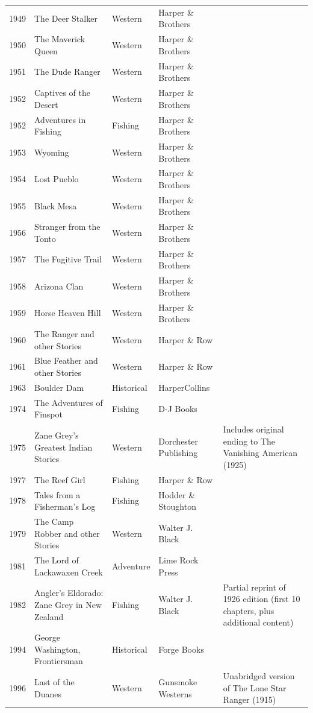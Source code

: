 \documentclass{article}
\begin{document}
\begin{tabular}{lllll}
1949 & The Deer Stalker & Western & Harper \& Brothers &  \\
1950 & The Maverick Queen & Western & Harper \& Brothers &  \\
1951 & The Dude Ranger & Western & Harper \& Brothers &  \\
1952 & Captives of the Desert & Western & Harper \& Brothers &  \\
1952 & Adventures in Fishing & Fishing & Harper \& Brothers &  \\
1953 & Wyoming & Western & Harper \& Brothers &  \\
1954 & Lost Pueblo & Western & Harper \& Brothers &  \\
1955 & Black Mesa & Western & Harper \& Brothers &  \\
1956 & Stranger from the Tonto & Western & Harper \& Brothers &  \\
1957 & The Fugitive Trail & Western & Harper \& Brothers &  \\
1958 & Arizona Clan & Western & Harper \& Brothers &  \\
1959 & Horse Heaven Hill & Western & Harper \& Brothers &  \\
1960 & The Ranger and other Stories & Western & Harper \& Row &  \\
1961 & Blue Feather and other Stories & Western & Harper \& Row &  \\
1963 & Boulder Dam & Historical & HarperCollins &  \\
1974 & The Adventures of Finspot & Fishing & D-J Books &  \\
1975 & Zane Grey's Greatest Indian Stories & Western & Dorchester Publishing & Includes original ending to The Vanishing American (1925) \\
1977 & The Reef Girl & Fishing & Harper \& Row &  \\
1978 & Tales from a Fisherman’s Log & Fishing & Hodder \& Stoughton &  \\
1979 & The Camp Robber and other Stories & Western & Walter J. Black &  \\
1981 & The Lord of Lackawaxen Creek & Adventure & Lime Rock Press &  \\
1982 & Angler's Eldorado: Zane Grey in New Zealand & Fishing & Walter J. Black & Partial reprint of 1926 edition (first 10 chapters, plus additional content) \\
1994 & George Washington, Frontiersman & Historical & Forge Books &  \\
1996 & Last of the Duanes & Western & Gunsmoke Westerns & Unabridged version of The Lone Star Ranger (1915) \\

\end{tabular}
\end{document}
